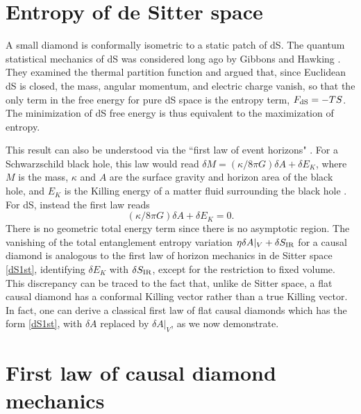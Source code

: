 \documentclass[aps,prd,twocolumn,showpacs,groupedaddress,nofootinbib,longbibliography]{revtex4-1}
\def\beq{\begin{equation}}
\def\eeq{\end{equation}}
\def\d{\delta}\def\D{\Delta}
\def\k{\kappa}
\begin{document}
\section{Entropy of de Sitter space}
\label{AppC}

A small diamond %
is conformally isometric to a static patch of dS. %
The quantum statistical mechanics of dS was considered long ago by 
Gibbons and Hawking \cite{Gibbons:1976ue}. They examined the thermal partition function and argued that, since Euclidean dS is closed, the mass, angular momentum, and electric charge vanish, so that the only term in the free energy for pure dS space is the entropy term, $F_{\rm dS}=-TS$. The minimization of dS free energy is thus equivalent to the maximization of entropy. %

This result can also be understood via the ``first law of event horizons" \cite{Gibbons:1977mu}.
For a Schwarzschild black hole, this law would read $\d M = (\k/8\pi G)\d A + \d E_K$, where  $M$ is the mass, 
$\k$ and $A$ are the surface gravity and horizon area of the black hole, and $E_K$ is the Killing energy of a matter fluid 
surrounding the black hole \cite{Bardeen:1973gs}. 
For dS, instead the first law reads
%
\beq\label{dS1st}
(\k/8\pi G)\d A + \d E_K=0.
\eeq
% 
There is no geometric total energy term since there is no asymptotic region. 
The vanishing of the 
total entanglement entropy variation $\eta\d A|_V + \d S_{\rm IR}$ for a causal diamond 
 is analogous to the first law of horizon mechanics 
in de Sitter space \eqref{dS1st}, identifying  $\d E_K$ with $\d S_{\rm IR}$, except for the 
restriction to fixed volume. This discrepancy can be traced to the fact that, unlike de Sitter space, 
a flat causal diamond has a conformal Killing vector rather than a true Killing vector.
In fact, one can derive a classical first law of flat causal diamonds which has the form \eqref{dS1st}, 
with $\d A$ replaced by $\d A|_V$, as we now demonstrate.


\section{First law of causal diamond mechanics}
\label{AppD}
\end{document}
